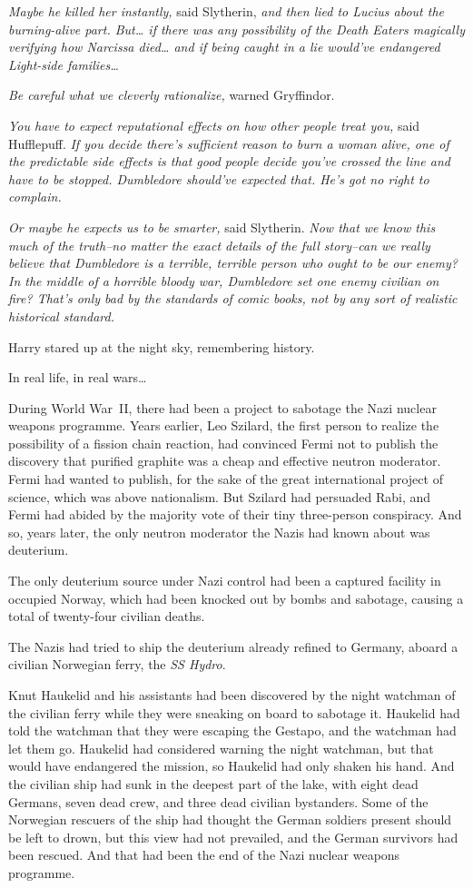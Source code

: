 \emph{Maybe he killed her instantly,} said Slytherin, \emph{and then lied to Lucius about the burning-alive part. But{\ldots} if there was \emph{any} possibility of the Death Eaters magically verifying how Narcissa died{\ldots} and if being caught in a lie would've endangered Light-side families{\ldots}}

\emph{Be careful what we cleverly rationalize,} warned Gryffindor.

\emph{You have to expect reputational effects on how other people treat you,} said Hufflepuff. \emph{If you decide there's sufficient reason to burn a woman alive, one of the predictable side effects is that good people decide you've crossed the line and have to be stopped. Dumbledore should've expected that. He's got no right to complain.}

\emph{Or maybe he expects us to be smarter,} said Slytherin. \emph{Now that we know this much of the truth\---no matter the exact details of the full story\---can we really believe that Dumbledore is a terrible, terrible person who ought to be our enemy? In the middle of a horrible bloody war, Dumbledore set \emph{one} enemy civilian on fire? That's only bad by the standards of comic books, not by any sort of realistic historical standard.}

Harry stared up at the night sky, remembering history.

In real life, in real wars{\ldots}

During World War~II, there had been a project to sabotage the Nazi nuclear weapons programme. Years earlier, Leo Szilard, the first person to realize the possibility of a fission chain reaction, had convinced Fermi not to publish the discovery that purified graphite was a cheap and effective neutron moderator. Fermi had wanted to publish, for the sake of the great international project of science, which was above nationalism. But Szilard had persuaded Rabi, and Fermi had abided by the majority vote of their tiny three-person conspiracy. And so, years later, the only neutron moderator the Nazis had known about was deuterium.

The only deuterium source under Nazi control had been a captured facility in occupied Norway, which had been knocked out by bombs and sabotage, causing a total of twenty-four civilian deaths.

The Nazis had tried to ship the deuterium already refined to Germany, aboard a civilian Norwegian ferry, the \emph{SS Hydro}.

Knut Haukelid and his assistants had been discovered by the night watchman of the civilian ferry while they were sneaking on board to sabotage it. Haukelid had told the watchman that they were escaping the Gestapo, and the watchman had let them go. Haukelid had considered warning the night watchman, but that would have endangered the mission, so Haukelid had only shaken his hand. And the civilian ship had sunk in the deepest part of the lake, with eight dead Germans, seven dead crew, and three dead civilian bystanders. Some of the Norwegian rescuers of the ship had thought the German soldiers present should be left to drown, but this view had not prevailed, and the German survivors had been rescued. And that had been the end of the Nazi nuclear weapons programme.

